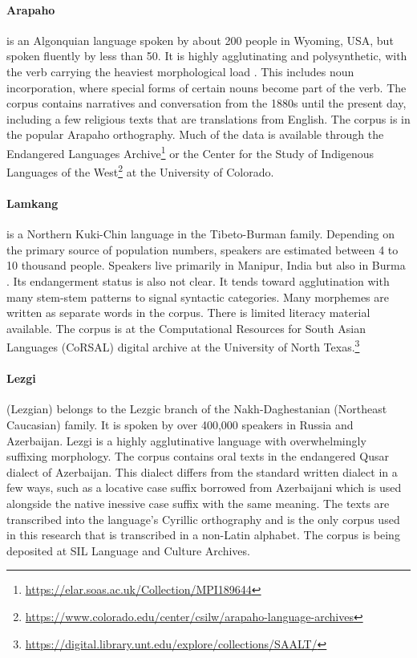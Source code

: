 \paragraph{Arapaho}
is an Algonquian language spoken by about 200 people in Wyoming, USA, but spoken fluently by less than 50. It is highly agglutinating and polysynthetic, with the verb carrying the heaviest morphological load \citep{cowell_arapaho_2008}. This includes noun incorporation, where special forms of certain nouns become part of the verb. The corpus contains narratives and conversation from the 1880s until the present day, including a few religious texts that are translations from English. The corpus is in the popular Arapaho orthography. Much of the data is available through the Endangered Languages Archive\footnote{\url{https://elar.soas.ac.uk/Collection/MPI189644}} or the Center for the Study of Indigenous Languages of the West\footnote{\url{https://www.colorado.edu/center/csilw/arapaho-language-archives}} at the University of Colorado.

\paragraph{Lamkang} 
is a Northern Kuki-Chin language in the Tibeto-Burman family. Depending on the primary source of population numbers, speakers are estimated between 4 to 10 thousand people. Speakers live primarily in Manipur, India but also in Burma \citep{lamkang_2007}. Its endangerment status is also not clear. It tends toward agglutination with many stem-stem patterns to signal syntactic categories. Many morphemes are written as separate words in the corpus. There is limited literacy material available. The corpus is at the Computational Resources for South Asian Languages (CoRSAL) digital archive at the University of North Texas.\footnote{\url{https://digital.library.unt.edu/explore/collections/SAALT/}}

\paragraph{Lezgi} 
(Lezgian) belongs to the Lezgic branch of the Nakh-Daghestanian (Northeast Caucasian) family. It is spoken by over 400,000 speakers in Russia and Azerbaijan. Lezgi is a highly agglutinative language with overwhelmingly suffixing morphology. The corpus contains oral texts in the endangered Qusar dialect of Azerbaijan. This dialect differs from the standard written dialect in a few ways, such as a locative case suffix borrowed from Azerbaijani which is used alongside the native inessive case suffix with the same meaning. The texts are transcribed into the language's Cyrillic orthography and is the only corpus used in this research that is transcribed in a non-Latin alphabet. The corpus is being deposited at SIL Language and Culture Archives.

